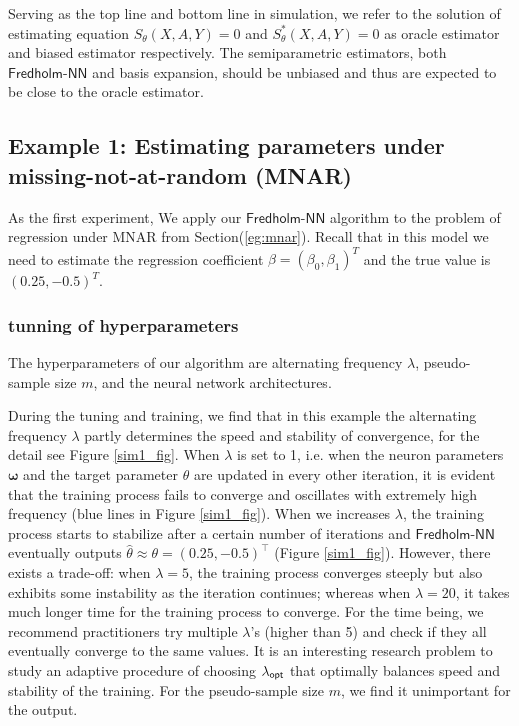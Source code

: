 \documentclass[11pt]{article}
\def\fred{\mathsf{Fredholm\mbox{-}NN}}
\begin{document}
Serving as the top line and bottom line in simulation, we refer to the solution of estimating equation $S_{\theta}(X,A,Y)=0$ and $S^{*}_{\theta}(X,A,Y)=0$ as oracle estimator and biased estimator respectively. The semiparametric estimators, both $\fred$ and basis expansion, should be unbiased and thus are expected to be close to the oracle estimator.


\subsection{Example 1: Estimating parameters under missing-not-at-random (MNAR)}
\label{sec:mnar}

As the first experiment, We apply our $\fred$ algorithm to the problem of  regression under MNAR from Section(\ref{eg:mnar}). Recall that in this model we need to estimate the regression coefficient $\beta = (\beta_{0}, \beta_{1})^{T}$ and the true value is $(0.25, -0.5)^{T}$. 

\subsubsection{tunning of hyperparameters}

The hyperparameters of our algorithm are alternating frequency $\lambda$, pseudo-sample size $m$, and the neural network architectures.

During the tuning and training, we find that in this example the alternating frequency $\lambda$ partly determines the speed and stability of convergence, for the detail see Figure \ref{sim1_fig}. When $\lambda$ is set to 1, i.e. when the neuron parameters $\bm{\omega}$ and the target parameter $\theta$ are updated in every other iteration, it is evident that the training process fails to converge and oscillates with extremely high frequency (blue lines in Figure \ref{sim1_fig}). When we increases $\lambda$, the training process starts to stabilize after a certain number of iterations and $\fred$ eventually outputs $\hat{\theta} \approx \theta = (0.25, -0.5)^{\top}$ (Figure \ref{sim1_fig}). However, there exists a trade-off: when $\lambda = 5$, the training process converges steeply but also exhibits some instability as the iteration continues; whereas when $\lambda = 20$, it takes much longer time for the training process to converge. For the time being, we recommend practitioners try multiple $\lambda$'s (higher than 5) and check if they all eventually converge to the same values. It is an interesting research problem to study an adaptive procedure of choosing $\lambda_{\mathsf{opt}}$ that optimally balances speed and stability of the training. For the pseudo-sample size $m$, we find it unimportant for the output.
\end{document}
